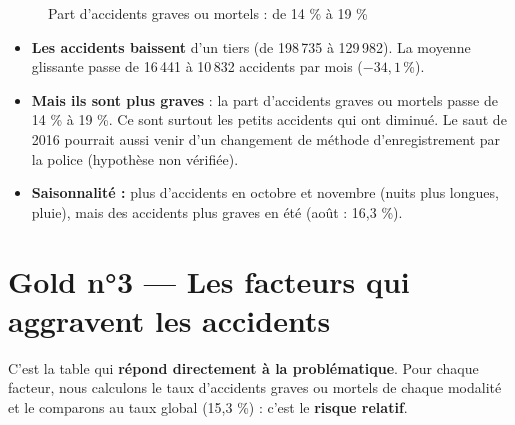 \documentclass[11pt,a4paper]{report}
\begin{document}
\begin{figure}[H]
\centering
{}
\caption{Part d'accidents graves ou mortels : de 14 \% à 19 \%}
\end{figure}

\begin{keybox}
\begin{itemize}
  \item \textbf{Les accidents baissent} d'un tiers (de 198\,735 à 129\,982). La moyenne glissante passe de 16\,441 à 10\,832 accidents par mois ($-34{,}1$\,\%).
  \item \textbf{Mais ils sont plus graves} : la part d'accidents graves ou mortels passe de 14 \% à 19 \%. Ce sont surtout les petits accidents qui ont diminué. Le saut de 2016 pourrait aussi venir d'un changement de méthode d'enregistrement par la police (hypothèse non vérifiée).
  \item \textbf{Saisonnalité :} plus d'accidents en octobre et novembre (nuits plus longues, pluie), mais des accidents plus graves en été (août : 16,3 \%).
\end{itemize}
\end{keybox}

\section{Gold n°3 — Les facteurs qui aggravent les accidents}

C'est la table qui \textbf{répond directement à la problématique}. Pour chaque facteur, nous calculons le taux d'accidents graves ou mortels de chaque modalité et le comparons au taux global (15,3 \%) : c'est le \textbf{risque relatif}.
\end{document}
